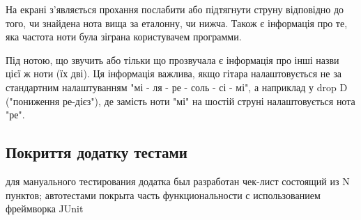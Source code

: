 На екрані з'являється прохання послабити або підтягнути струну відповідно до того, чи знайдена нота вища за еталонну, чи нижча. Також є інформація про те, яка частота ноти була зіграна користувачем программи.

Під нотою, що звучить або тільки що прозвучала є інформація про інші назви цієї ж ноти (їх дві). Ця інформація важлива, якщо гітара налаштовується не за стандартним налаштуванням "мі - ля - ре - соль - сі - мі", а наприклад у drop D ("пониження ре-дієз"), де замість ноти "мі" на шостій струні налаштовується нота "ре".

\subsection{Покриття додатку тестами}

для мануального тестирования додатка был разработан чек-лист состоящий из N пунктов;
автотестами покрыта часть функциональности с использованием фреймворка JUnit